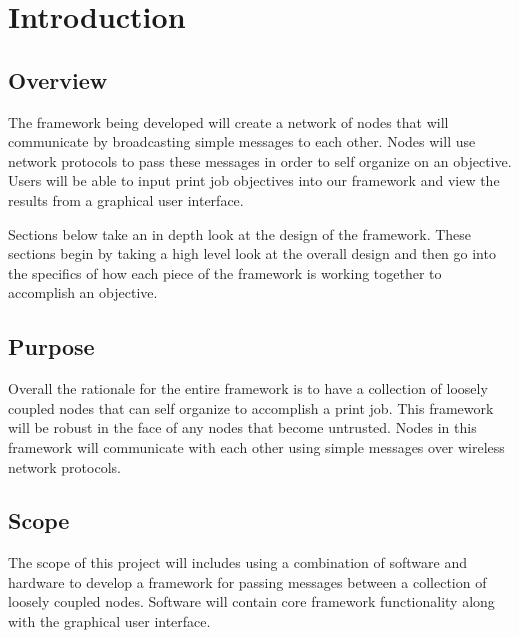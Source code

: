 \documentclass[draftclsnofoot, onecolumn, compsoc, 10pt]{IEEEtran}
\begin{document}
\section{Introduction}
\subsection{Overview}
The framework being developed will create a network of nodes that will communicate by broadcasting simple messages to each other. Nodes will use network protocols to pass these messages in order to self organize on an objective. Users will be able to input print job objectives into our framework and view the results from a graphical user interface.

Sections below take an in depth look at the design of the framework. These sections begin by taking a high level look at the overall design and then go into the specifics of how each piece of the framework is working together to accomplish an objective.

\subsection{Purpose}
Overall the rationale for the entire framework is to have a collection of loosely coupled nodes that can self organize to accomplish a print job. This framework will be robust in the face of any nodes that become untrusted. Nodes in this framework will communicate with each other using simple messages over wireless network protocols. 

\subsection{Scope}
The scope of this project will includes using a combination of software and hardware to develop a framework for passing messages between a collection of loosely coupled nodes. Software will contain core framework functionality along with the graphical user interface. 
\end{document}

